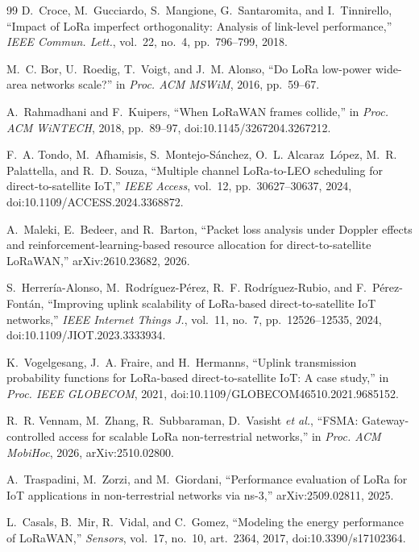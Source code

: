 \documentclass[journal]{IEEEtran}
\begin{document}
\begin{thebibliography}{99}
 D.~Croce, M.~Gucciardo, S.~Mangione, G.~Santaromita, and I.~Tinnirello, ``Impact of LoRa imperfect orthogonality: Analysis of link-level performance,'' \emph{IEEE Commun. Lett.}, vol.~22, no.~4, pp.~796--799, 2018.

 M.~C. Bor, U.~Roedig, T.~Voigt, and J.~M. Alonso, ``Do LoRa low-power wide-area networks scale?'' in \emph{Proc. ACM MSWiM}, 2016, pp.~59--67.

 A.~Rahmadhani and F.~Kuipers, ``When LoRaWAN frames collide,'' in \emph{Proc. ACM WiNTECH}, 2018, pp.~89--97, doi:10.1145/3267204.3267212.

 F.~A. Tondo, M.~Afhamisis, S.~Montejo-S\'anchez, O.~L. Alcaraz~L\'opez, M.~R. Palattella, and R.~D. Souza, ``Multiple channel LoRa-to-LEO scheduling for direct-to-satellite IoT,'' \emph{IEEE Access}, vol.~12, pp.~30627--30637, 2024, doi:10.1109/ACCESS.2024.3368872.

 A.~Maleki, E.~Bedeer, and R.~Barton, ``Packet loss analysis under Doppler effects and reinforcement-learning-based resource allocation for direct-to-satellite LoRaWAN,'' arXiv:2610.23682, 2026.

 S.~Herrer\'ia-Alonso, M.~Rodr\'iguez-P\'erez, R.~F. Rodr\'iguez-Rubio, and F.~P\'erez-Font\'an, ``Improving uplink scalability of LoRa-based direct-to-satellite IoT networks,'' \emph{IEEE Internet Things J.}, vol.~11, no.~7, pp.~12526--12535, 2024, doi:10.1109/JIOT.2023.3333934.

 K.~Vogelgesang, J.~A. Fraire, and H.~Hermanns, ``Uplink transmission probability functions for LoRa-based direct-to-satellite IoT: A case study,'' in \emph{Proc. IEEE GLOBECOM}, 2021, doi:10.1109/GLOBECOM46510.2021.9685152.

 R.~R. Vennam, M.~Zhang, R.~Subbaraman, D.~Vasisht \emph{et al.}, ``FSMA: Gateway-controlled access for scalable LoRa non-terrestrial networks,'' in \emph{Proc. ACM MobiHoc}, 2026, arXiv:2510.02800.

 A.~Traspadini, M.~Zorzi, and M.~Giordani, ``Performance evaluation of LoRa for IoT applications in non-terrestrial networks via ns-3,'' arXiv:2509.02811, 2025.

 L.~Casals, B.~Mir, R.~Vidal, and C.~Gomez, ``Modeling the energy performance of LoRaWAN,'' \emph{Sensors}, vol.~17, no.~10, art.~2364, 2017, doi:10.3390/s17102364.


\end{thebibliography}
\end{document}
